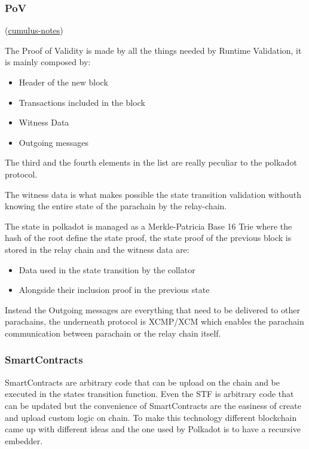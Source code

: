 \documentclass[../main.tex]{subfiles}
\begin{document}
\subsubsection{PoV}
(\href{https://github.com/paritytech/cumulus/blob/master/docs/overview.md}{cumulus-notes})

The Proof of Validity is made by all the things needed by Runtime Validation, it is mainly composed by:

\begin{itemize}
  \item Header of the new block
  \item Transactions included in the block
  \item Witness Data
  \item Outgoing messages
\end{itemize}

The third and the fourth elements in the list are really peculiar to the polkadot protocol.

The witness data is what makes possible the state transition validation withouth knowing the entire state of the parachain by the relay-chain.

The state in polkadot is managed as a Merkle-Patricia Base 16 Trie where the hash of the root define the state proof, the state proof of the previous block is stored in the relay chain and the witness data are:

\begin{itemize}
  \item Data used in the state transition by the collator
  \item Alongside their inclusion proof in the previous state
\end{itemize}

Instead the Outgoing messages are everything that need to be delivered to other parachains, the underneath protocol is XCMP/XCM which enables the parachain communication between parachain or the relay chain itself.

\subsubsection{SmartContracts}

SmartContracts are arbitrary code that can be upload on the chain and be executed in the states transition function. Even the STF is arbitrary code that can be updated but the convenience of SmartContracts are the easiness of create and upload custom logic on chain. To make this technology different blockchain came up with different ideas and the one used by Polkadot is to have a recursive embedder.
\end{document}
